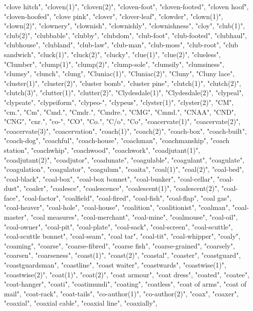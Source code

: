 "clove hitch",
"cloven(1)",
"cloven(2)",
"cloven-foot",
"cloven-footed",
"cloven hoof",
"cloven-hoofed",
"clove pink",
"clover",
"clover-leaf",
"clowder",
"clown(1)",
"clown(2)",
"clownery",
"clownish",
"clownishly",
"clownishness",
"cloy",
"club(1)",
"club(2)",
"clubbable",
"clubby",
"clubdom",
"club-foot",
"club-footed",
"clubhaul",
"clubhouse",
"clubland",
"club-law",
"club-man",
"club-moss",
"club-root",
"club sandwich",
"cluck(1)",
"cluck(2)",
"clucky",
"clue(1)",
"clue(2)",
"clueless",
"Clumber",
"clump(1)",
"clump(2)",
"clump-sole",
"clumsily",
"clumsiness",
"clumsy",
"clunch",
"clung",
"Cluniac(1)",
"Cluniac(2)",
"Cluny",
"Cluny lace",
"cluster(1)",
"cluster(2)",
"cluster bomb",
"cluster pine",
"clutch(1)",
"clutch(2)",
"clutch(3)",
"clutter(1)",
"clutter(2)",
"Clydesdale(1)",
"Clydesdale(2)",
"clypeal",
"clypeate",
"clypeiform",
"clypeo-",
"clypeus",
"clyster(1)",
"clyster(2)",
"CM",
"cm.",
"Cm",
"Cmd.",
"Cmdr.",
"Cmdre.",
"CMG",
"Cmnd.",
"CNAA",
"CND",
"CNG",
"cnr.",
"co-",
"CO",
"Co.",
"C/o",
"Co",
"coacervate(1)",
"coacervate(2)",
"coacervate(3)",
"coacervation",
"coach(1)",
"coach(2)",
"coach-box",
"coach-built",
"coach-dog",
"coachful",
"coach-house",
"coachman",
"coachmanship",
"coach station",
"coachwhip",
"coachwood",
"coachwork",
"coadjutant(1)",
"coadjutant(2)",
"coadjutor",
"coadunate",
"coagulable",
"coagulant",
"coagulate",
"coagulation",
"coagulator",
"coagulum",
"coaita",
"coal(1)",
"coal(2)",
"coal-bed",
"coal-black",
"coal-box",
"coal-box bonnet",
"coal-bunker",
"coal-cellar",
"coal-dust",
"coaler",
"coalesce",
"coalescence",
"coalescent(1)",
"coalescent(2)",
"coal-face",
"coal-factor",
"coalfield",
"coal-fired",
"coal-fish",
"coal-flap",
"coal gas",
"coal-heaver",
"coal-hole",
"coal-house",
"coalition",
"coalitionist",
"coalman",
"coal-master",
"coal measures",
"coal-merchant",
"coal-mine",
"coalmouse",
"coal-oil",
"coal-owner",
"coal-pit",
"coal-plate",
"coal-sack",
"coal-screen",
"coal-scuttle",
"coal-scuttle bonnet",
"coal-seam",
"coal tar",
"coal-tit",
"coal-whipper",
"coaly",
"coaming",
"coarse",
"coarse-fibred",
"coarse fish",
"coarse-grained",
"coarsely",
"coarsen",
"coarseness",
"coast(1)",
"coast(2)",
"coastal",
"coaster",
"coastguard",
"coastguardsman",
"coastline",
"coast waiter",
"coastwards",
"coastwise(1)",
"coastwise(2)",
"coat(1)",
"coat(2)",
"coat armour",
"coat dress",
"coated",
"coatee",
"coat-hanger",
"coati",
"coatimundi",
"coating",
"coatless",
"coat of arms",
"coat of mail",
"coat-rack",
"coat-tails",
"co-author(1)",
"co-author(2)",
"coax",
"coaxer",
"coaxial",
"coaxial cable",
"coaxial line",
"coaxially",
